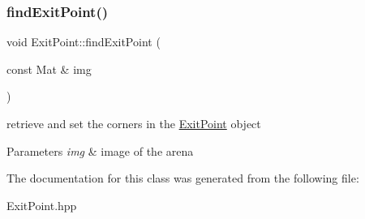 \subsubsection{\texorpdfstring{find\+Exit\+Point()}{findExitPoint()}}
{\footnotesize\ttfamily void Exit\+Point\+::find\+Exit\+Point (\begin{DoxyParamCaption}\item[{const Mat \&}]{img }\end{DoxyParamCaption})}

retrieve and set the corners in the \mbox{\hyperlink{class_exit_point}{Exit\+Point}} object 
\begin{DoxyParams}{Parameters}
{\em img} & image of the arena \\
\hline
\end{DoxyParams}


The documentation for this class was generated from the following file\+:\begin{DoxyCompactItemize}
\item 
Exit\+Point.\+hpp\end{DoxyCompactItemize}
